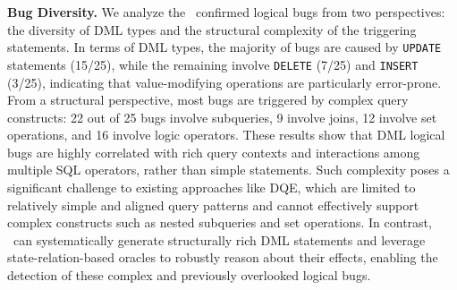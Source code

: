 \textbf{Bug Diversity.}
We analyze the \logical\ confirmed logical bugs from two perspectives: the diversity of DML types and the structural complexity of the triggering statements. 
In terms of DML types, the majority of bugs are caused by \texttt{UPDATE} statements (15/25), while the remaining involve \texttt{DELETE} (7/25) and \texttt{INSERT} (3/25), indicating that value-modifying operations are particularly error-prone. 
From a structural perspective, most bugs are triggered by complex query constructs: 22 out of 25 bugs involve subqueries, 9 involve joins, 12 involve set operations, and 16 involve logic operators. 
These results show that DML logical bugs are highly correlated with rich query contexts and interactions among multiple SQL operators, rather than simple statements. 
Such complexity poses a significant challenge to existing approaches like \textsc{DQE}, which are limited to relatively simple and aligned query patterns and cannot effectively support complex constructs such as nested subqueries and set operations. 
In contrast, \toolname\ can systematically generate structurally rich DML statements and leverage state-relation-based oracles to robustly reason about their effects, enabling the detection of these complex and previously overlooked logical bugs.

